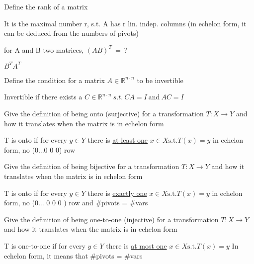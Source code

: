 \documentclass[12pt]{article}
\newcommand*{\xfield}[1]{\begin{mdframed}\centering #1\end{mdframed}\bigskip}
\newenvironment{note}{}{}
\begin{document}
\begin{note}
    \xfield{Define the rank of a matrix}
    \xfield{It is the maximal number r, s.t. A has r lin. indep. columns (in echelon form, it can be deduced from the numbers of pivots)}
\end{note}

\begin{note}
    \xfield{for A and B two matrices, \begin{math}(AB)^T\ =\ ?\end{math}}
    \xfield{\begin{math}B^TA^T\end{math}}
\end{note}

\begin{note}
    \xfield{Define the condition for a matrix \begin{math}A \in \mathbb{R}^{n\cdot n} \end{math} to be invertible}
    \xfield{Invertible if there exists a \begin{math}C \in \mathbb{R}^{n\cdot n}\ s.t.\ CA = I\ \text{and}\ AC = I\end{math}}
\end{note}

\begin{note}
    \xfield{Give the definition of being onto (surjective) for a transformation $T : X \rightarrow Y$ and how it translates when the matrix is in echelon form}
    \xfield{T is onto if for every \begin{math}y \in Y\end{math} there is \underline{at least one} \begin{math}x \in X \text{s.t.} T(x)=y\end{math} in echelon form, no (0...0 0 0) row}
\end{note}

\begin{note}
    \xfield{Give the definition of being bijective for a transformation $T : X \rightarrow Y$ and how it translates when the matrix is in echelon form}
    \xfield{T is onto if for every \begin{math}y \in Y\end{math} there is \underline{exactly one} \begin{math}x \in X \text{s.t.} T(x)=y\end{math} in echelon form, no (0... 0 0 0 ) row and \#pivots = \#vars}
\end{note}

\begin{note}
    \xfield{Give the definition of being one-to-one (injective) for a transformation $T : X \rightarrow Y$ and how it translates when the matrix is in echelon form}
    \xfield{T is one-to-one if for every \begin{math}y \in Y\end{math} there is \underline{at most one} \begin{math}x \in X \text{s.t.} T(x)=y\end{math} In echelon form, it means that \#pivots = \#vars}
\end{note}
\end{document}
